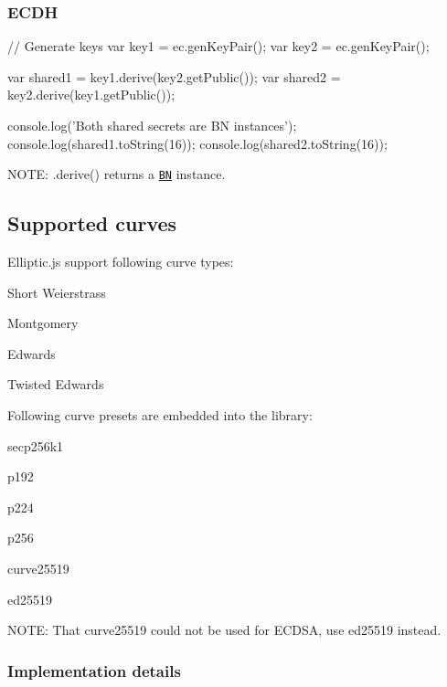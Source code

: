 \subsubsection*{E\+C\+DH}


\begin{DoxyCode}
// Generate keys
var key1 = ec.genKeyPair();
var key2 = ec.genKeyPair();

var shared1 = key1.derive(key2.getPublic());
var shared2 = key2.derive(key1.getPublic());

console.log('Both shared secrets are BN instances');
console.log(shared1.toString(16));
console.log(shared2.toString(16));
\end{DoxyCode}


N\+O\+TE\+: {\ttfamily .derive()} returns a \href{https://github.com/indutny/bn.js}{\tt BN} instance.

\subsection*{Supported curves}

Elliptic.\+js support following curve types\+:


\begin{DoxyItemize}
\item Short Weierstrass
\item Montgomery
\item Edwards
\item Twisted Edwards
\end{DoxyItemize}

Following curve \textquotesingle{}presets\textquotesingle{} are embedded into the library\+:


\begin{DoxyItemize}
\item {\ttfamily secp256k1}
\item {\ttfamily p192}
\item {\ttfamily p224}
\item {\ttfamily p256}
\item {\ttfamily curve25519}
\item {\ttfamily ed25519}
\end{DoxyItemize}

N\+O\+TE\+: That {\ttfamily curve25519} could not be used for E\+C\+D\+SA, use {\ttfamily ed25519} instead.

\subsubsection*{Implementation details}

